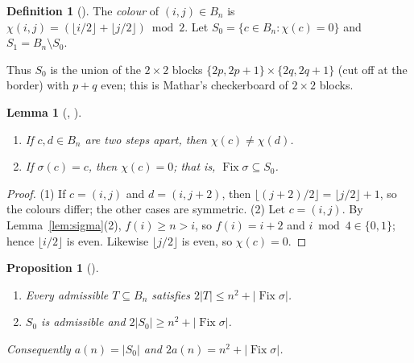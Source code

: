 \documentclass[11pt]{amsart}
\theoremstyle{plain}
\newtheorem{lemma}[theorem]{Lemma}
\newtheorem{proposition}[theorem]{Proposition}
\theoremstyle{definition}
\newtheorem{definition}[theorem]{Definition}
\newcommand{\Fix}{\operatorname{Fix}}
\newcommand{\B}{B_n}
\begin{document}
\begin{definition}[]\label{def:colour}
The \emph{colour} of $(i,j)\in\B$ is $\chi(i,j)=(\lfloor i/2\rfloor+\lfloor j/2\rfloor)\bmod 2$. Let $S_0=\{c\in\B:\chi(c)=0\}$ and $S_1=\B\setminus S_0$.
\end{definition}

Thus $S_0$ is the union of the $2\times2$ blocks $\{2p,2p+1\}\times\{2q,2q+1\}$ (cut off at the border) with $p+q$ even; this is Mathar's checkerboard of $2\times2$ blocks.

\begin{lemma}[, ]\label{lem:colour}
\begin{enumerate}
\item If $c,d\in\B$ are two steps apart, then $\chi(c)\ne\chi(d)$.
\item If $\sigma(c)=c$, then $\chi(c)=0$; that is, $\Fix\sigma\subseteq S_0$.
\end{enumerate}
\end{lemma}

\begin{proof}
(1) If $c=(i,j)$ and $d=(i,j+2)$, then $\lfloor (j+2)/2\rfloor=\lfloor j/2\rfloor+1$, so the colours differ; the other cases are symmetric.
(2) Let $c=(i,j)$. By Lemma~\ref{lem:sigma}(2), $f(i)\ge n>i$, so $f(i)=i+2$ and $i\bmod4\in\{0,1\}$; hence $\lfloor i/2\rfloor$ is even. Likewise $\lfloor j/2\rfloor$ is even, so $\chi(c)=0$.
\end{proof}

\begin{proposition}[]\label{prop:key}
\begin{enumerate}
\item Every admissible $T\subseteq\B$ satisfies $2|T|\le n^2+|\Fix\sigma|$.
\item $S_0$ is admissible and $2|S_0|\ge n^2+|\Fix\sigma|$.
\end{enumerate}
Consequently $a(n)=|S_0|$ and $2a(n)=n^2+|\Fix\sigma|$.
\end{proposition}
\end{document}
